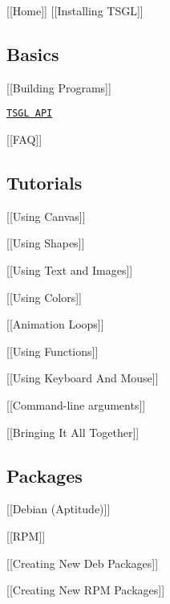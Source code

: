 \mbox{[}\mbox{[}Home\mbox{]}\mbox{]} \mbox{[}\mbox{[}Installing T\-S\-G\-L\mbox{]}\mbox{]}

\subsection*{Basics}


\begin{DoxyItemize}
\item \mbox{[}\mbox{[}Building Programs\mbox{]}\mbox{]}
\item \href{http://calvin-cs.github.io/TSGL/html/annotated.html}{\tt T\-S\-G\-L A\-P\-I}
\item \mbox{[}\mbox{[}F\-A\-Q\mbox{]}\mbox{]}
\end{DoxyItemize}

\subsection*{Tutorials}


\begin{DoxyItemize}
\item \mbox{[}\mbox{[}Using Canvas\mbox{]}\mbox{]}
\item \mbox{[}\mbox{[}Using Shapes\mbox{]}\mbox{]}
\item \mbox{[}\mbox{[}Using Text and Images\mbox{]}\mbox{]}
\item \mbox{[}\mbox{[}Using Colors\mbox{]}\mbox{]}
\item \mbox{[}\mbox{[}Animation Loops\mbox{]}\mbox{]}
\item \mbox{[}\mbox{[}Using Functions\mbox{]}\mbox{]}
\item \mbox{[}\mbox{[}Using Keyboard And Mouse\mbox{]}\mbox{]}
\item \mbox{[}\mbox{[}Command-\/line arguments\mbox{]}\mbox{]}
\item \mbox{[}\mbox{[}Bringing It All Together\mbox{]}\mbox{]}
\end{DoxyItemize}

\subsection*{Packages}


\begin{DoxyItemize}
\item \mbox{[}\mbox{[}Debian (Aptitude)\mbox{]}\mbox{]}
\item \mbox{[}\mbox{[}R\-P\-M\mbox{]}\mbox{]}
\item \mbox{[}\mbox{[}Creating New Deb Packages\mbox{]}\mbox{]}
\item \mbox{[}\mbox{[}Creating New R\-P\-M Packages\mbox{]}\mbox{]}
\end{DoxyItemize}

